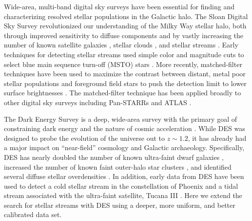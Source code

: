 \documentclass[twocolumn]{aastex61}
\begin{document}
Wide-area, multi-band digital sky surveys have been essential for finding and characterizing resolved stellar populations in the Galactic halo. 
The Sloan Digital Sky Survey \citep[SDSS;][]{York:2000} revolutionized our understanding of the Milky Way stellar halo, both through improved sensitivity to diffuse components \citep[e.g.,][]{Carollo:2007,Carollo:2010,Dejong:2010,Deason:2011,An:2013,Kafle:2013,Hattori:2013,An:2015,Das:2016} and by vastly increasing the number of known satellite galaxies 
\citep[e.g.,][]{Willman:2005a,Willman:2005b,Zucker:2006,2006ApJ...643L.103Z,2006ApJ...647L.111B,Belokurov:2007}, stellar clouds \citep[e.g.,][]{Newberg:2002,Yanny:2003,Rocha-Pinto:2004}, and stellar streams \citep[e.g.,][]{Odenkirchen:2001,Newberg:2002,Belokurov:2006,Grillmair:2006}. 
Early techniques for detecting stellar streams used simple color and magnitude cuts to select blue main sequence turn-off (MSTO) stars \citep[e.g.,][]{Grillmair:1995,Belokurov:2006}.
More recently, matched-filter techniques have been used to maximize the contrast between distant, metal poor stellar populations and foreground field stars to push the detection limit to lower surface brightnesses \citep[e.g.][]{Rockosi:2002}.
The matched-filter technique has been applied broadly to other digital sky surveys including Pan-STARRs \citep{Bernard:2014,Bernard:2016,Grillmair:2017} and ATLAS \citep{Koposov:2014}.

The Dark Energy Survey \citep[DES;][]{DES:2005,DES:2016} is a deep, wide-area survey with the primary goal of constraining dark energy and the nature of cosmic acceleration \citep[e.g.,][]{DES:2017}. 
While DES was designed to probe the evolution of the universe out to $z \sim 1.2$, it has already had a major impact on ``near-field'' cosmology and Galactic archaeology. 
Specifically, DES has nearly doubled the number of known ultra-faint dwarf galaxies \citep{Bechtol:2015,Koposov:2015,Kim:2015,Drlica-Wagner:2015}, increased the number of known faint outer-halo star clusters \citep{Pieres:2016,Luque:2016,Luque:2017,Luque:2017b}, and identified several diffuse stellar overdensities \citep{Li:2016,Pieres:2017}.
In addition, early data from DES have been used to detect a cold stellar stream in the constellation of Phoenix \citep{Balbinot:2016} and a tidal stream associated with the ultra-faint satellite, Tucana III \citep{Drlica-Wagner:2015}.
Here we extend the search for stellar streams with DES using a deeper, more uniform, and better calibrated data set.
\end{document}

